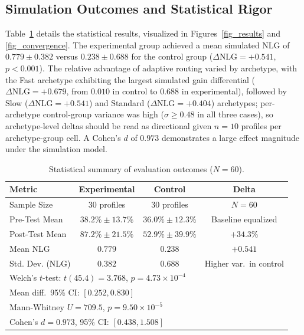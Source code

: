 \documentclass[notitlepage,12pt]{jedm}
\begin{document}
\subsection{Simulation Outcomes and Statistical Rigor}
Table~\ref{table_results} details the statistical results, visualized in Figures~\ref{fig_results} and \ref{fig_convergence}. The experimental group achieved a mean simulated NLG of $0.779 \pm 0.382$ versus $0.238 \pm 0.688$ for the control group ($\Delta\text{NLG}=+0.541$, $p<0.001$). The relative advantage of adaptive routing varied by archetype, with the Fast archetype exhibiting the largest simulated gain differential ($\Delta\text{NLG}=+0.679$, from $0.010$ in control to $0.688$ in experimental), followed by Slow ($\Delta\text{NLG}=+0.541$) and Standard ($\Delta\text{NLG}=+0.404$) archetypes; per-archetype control-group variance was high ($\sigma \geq 0.48$ in all three cases), so archetype-level deltas should be read as directional given $n=10$ profiles per archetype-group cell. A Cohen's $d$ of $0.973$ demonstrates a large effect magnitude under the simulation model.

\begin{table}
\caption{Statistical summary of evaluation outcomes ($N=60$).}
\label{table_results}
\centering
\small
\renewcommand{\arraystretch}{1.25}
\setlength{\tabcolsep}{7pt}
\begin{tabular}{|l|c|c|c|}
\hline
\textbf{Metric} & \textbf{Experimental} & \textbf{Control} & \textbf{Delta} \\
\hline
Sample Size & 30 profiles & 30 profiles & $N=60$ \\
\hline
Pre-Test Mean & $38.2\% \pm 13.7\%$ & $36.0\% \pm 12.3\%$ & Baseline equalized \\
\hline
Post-Test Mean & $87.2\% \pm 21.5\%$ & $52.9\% \pm 39.9\%$ & $+34.3\%$ \\
\hline
Mean NLG & $0.779$ & $0.238$ & $+0.541$ \\
\hline
Std. Dev. (NLG) & $0.382$ & $0.688$ & Higher var.\ in control \\
\hline
\multicolumn{4}{|l|}{Welch's $t$-test: $t(45.4)=3.768$, $p=4.73\times10^{-4}$} \\
\hline
\multicolumn{4}{|l|}{Mean diff.\ 95\% CI: $[0.252, 0.830]$} \\
\hline
\multicolumn{4}{|l|}{Mann-Whitney $U=709.5$, $p=9.50\times10^{-5}$} \\
\hline
\multicolumn{4}{|l|}{Cohen's $d=0.973$, 95\% CI: $[0.438, 1.508]$} \\
\hline
\end{tabular}
\renewcommand{\arraystretch}{1.0}
\end{table}
\end{document}
